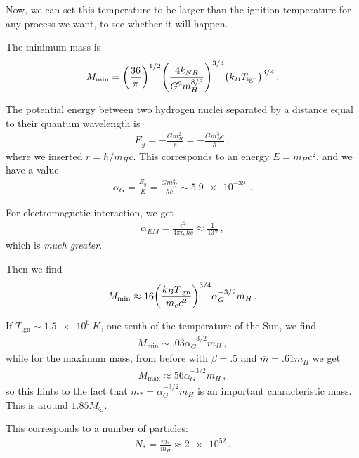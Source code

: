 \documentclass[main.tex]{subfiles}
\begin{document}
Now, we can set this temperature to be larger than the ignition temperature for any process we want, to see whether it will happen. 

The minimum mass is 
%
\begin{align}
  M _{\text{min}} = 
  \qty(\frac{36}{\pi })^{1/2} 
  \qty(\frac{4 k_{NR}}{G^2m_H^{8/3}})^{3/4}
  \qty(k_B T _{\text{ign}})^{3/4}
\,.
\end{align}

The potential energy between two hydrogen nuclei separated by a distance equal to their quantum wavelength is 
%
\begin{align}
E_g = - \frac{G m_H^2}{r} = - \frac{G m_H^{3}c }{\hbar}
\,,
\end{align}
%
where we inserted \(r = \hbar / m_H c\). This corresponds to an energy \(E = m_H c^2\), and we have a value 
%
\begin{align}
  \alpha_{G} = \frac{E_g}{E} =  \frac{G m_H^2}{\hbar c} \sim \SI{5.9e-39}{}
\,.
\end{align}

For electromagnetic interaction, we get 
%
\begin{align}
  \alpha_{EM} = \frac{e^2}{4 \pi \epsilon_{0} \hbar c} \approx \frac{1}{137}
\,,
\end{align}
%
which is \emph{much greater}. 

Then we find 
%
\begin{align}
  M _{\text{min}} \approx
  16 \qty(\frac{k_B T _{\text{ign}}}{m_e c^2})^{3/4}
  \alpha_{G}^{-3/2} m_H
\,.
\end{align}

If \(T _{\text{ign}} \sim \SI{1.5e6}{K}\), one tenth of the temperature of the Sun, we find 
%
\begin{align}
  M _{\text{min}} \sim \num{.03} \alpha_{G}^{-3/2} m_H
\,,
\end{align}
%
while for the maximum mass, from before with \(\beta = \num{.5}\) and \(\overline{m} = \num{.61} m_H\) we get 
%
\begin{align}
  M _{\text{max}} \approx 56 \alpha_{G}^{-3/2} m_H
\,,
\end{align}
%
so this hints to the fact that \(m_{*} = \alpha_{G}^{-3/2} m_H \) is an important characteristic mass. This is around \(\num{1.85} M_{\odot}\). 

This corresponds to a number of particles: 
%
\begin{align}
  N_{*} = \frac{m_{*}}{m_H} \approx \num{2e52}
\,.
\end{align}
\end{document}
